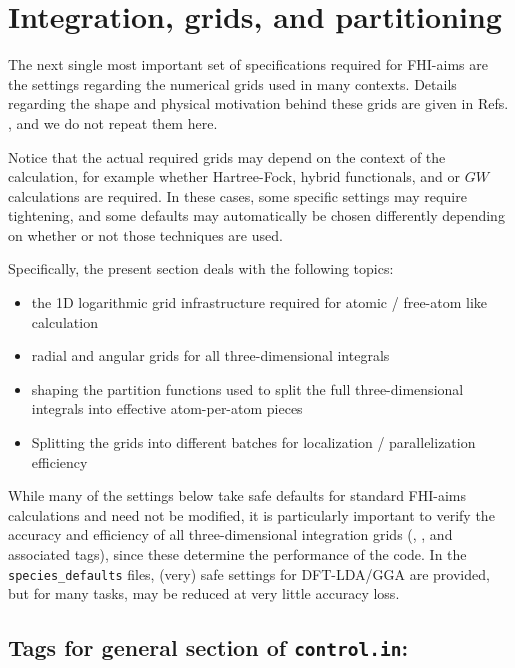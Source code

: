 \section{Integration, grids, and partitioning}

The next single most important set of specifications required for
FHI-aims are the settings regarding the numerical grids used in many
contexts. Details regarding the shape and physical motivation behind
these grids are given in Refs. \cite{Blum08,Havu08}, and we do not
repeat them here. 

Notice that the actual required grids may depend on the context of the
calculation, for example whether Hartree-Fock, hybrid functionals, and
or $GW$ calculations are required. In these cases, some specific
settings may require tightening, and some defaults may automatically
be chosen differently depending on whether or not those techniques are
used. 

Specifically, the present section deals with the following topics:
\begin{itemize}
  \item the 1D logarithmic grid infrastructure required for atomic /
    free-atom like calculation
  \item radial and angular grids for all three-dimensional integrals
  \item shaping the partition functions used to split the full
    three-dimensional integrals into effective atom-per-atom pieces
  \item Splitting the grids into different batches for localization /
    parallelization efficiency
\end{itemize}

While many of the settings below take safe defaults for standard
FHI-aims calculations and need not be modified, it is particularly
important to verify the accuracy and efficiency of 
all three-dimensional integration grids (,
, and associated tags), since
these determine the performance of the code. In the
\texttt{species\_defaults} files, (very) safe settings for DFT-LDA/GGA
are provided, but for many tasks, may be reduced at very little
accuracy loss. 

\newpage

\subsection*{Tags for general section of \texttt{control.in}:}

